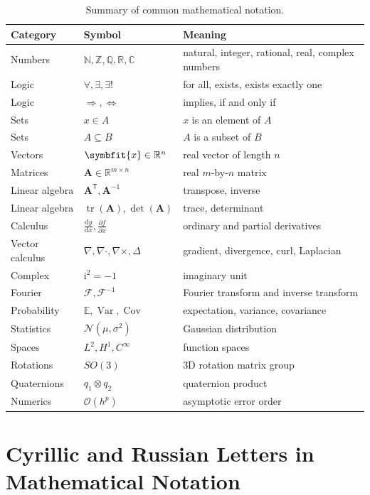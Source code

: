 \documentclass[11pt,twocolumn]{article}
\newcommand{\N}{\mathbb{N}}
\newcommand{\Z}{\mathbb{Z}}
\newcommand{\Q}{\mathbb{Q}}
\newcommand{\R}{\mathbb{R}}
\newcommand{\C}{\mathbb{C}}
\newcommand{\vct}[1]{\symbfit{#1}}   %
\newcommand{\mat}[1]{\symbf{#1}}     %
\newcommand{\T}{^{\mathsf{T}}}
\newcommand{\tr}{\operatorname{tr}}
\newcommand{\determinant}{\operatorname{det}}
\newcommand{\dv}[2]{\frac{\mathrm{d} #1}{\mathrm{d} #2}}
\newcommand{\pdv}[2]{\frac{\partial #1}{\partial #2}}
\newcommand{\grad}{\nabla}
\newcommand{\divg}{\nabla \cdot}
\newcommand{\curlop}{\nabla \times}
\newcommand{\ii}{\mathrm{i}}
\newcommand{\FT}{\mathcal{F}}
\newcommand{\IFT}{\mathcal{F}^{-1}}
\newcommand{\E}{\mathbb{E}}
\newcommand{\Var}{\operatorname{Var}}
\newcommand{\Cov}{\operatorname{Cov}}
\newcommand{\Normal}{\mathcal{N}}
\newcommand{\bigO}{\mathcal{O}}
\begin{document}
\begin{table}[t]
\centering
\caption{Summary of common mathematical notation.}
\begin{tabular}{lll}
\toprule
Category & Symbol & Meaning \\
\midrule
Numbers & $\N,\Z,\Q,\R,\C$ & natural, integer, rational, real, complex numbers \\
Logic & $\forall,\exists,\exists!$ & for all, exists, exists exactly one \\
Logic & $\Rightarrow,\Leftrightarrow$ & implies, if and only if \\
Sets & $x\in A$ & \(x\) is an element of \(A\) \\
Sets & $A\subseteq B$ & \(A\) is a subset of \(B\) \\
Vectors & $\vct{x}\in\R^n$ & real vector of length \(n\) \\
Matrices & $\mat{A}\in\R^{m\times n}$ & real \(m\)-by-\(n\) matrix \\
Linear algebra & $\mat{A}\T,\mat{A}^{-1}$ & transpose, inverse \\
Linear algebra & $\tr(\mat{A}),\determinant(\mat{A})$ & trace, determinant \\
Calculus & $\dv{y}{x},\pdv{f}{x}$ & ordinary and partial derivatives \\
Vector calculus & $\grad,\divg,\curlop,\Delta$ & gradient, divergence, curl, Laplacian \\
Complex & $\ii^2=-1$ & imaginary unit \\
Fourier & $\FT,\IFT$ & Fourier transform and inverse transform \\
Probability & $\E,\Var,\Cov$ & expectation, variance, covariance \\
Statistics & $\Normal(\mu,\sigma^2)$ & Gaussian distribution \\
Spaces & $L^2,H^1,C^\infty$ & function spaces \\
Rotations & $SO(3)$ & 3D rotation matrix group \\
Quaternions & $q_1\otimes q_2$ & quaternion product \\
Numerics & $\bigO(h^p)$ & asymptotic error order \\
\bottomrule
\end{tabular}
\end{table}

\section{Cyrillic and Russian Letters in Mathematical Notation}
\end{document}
